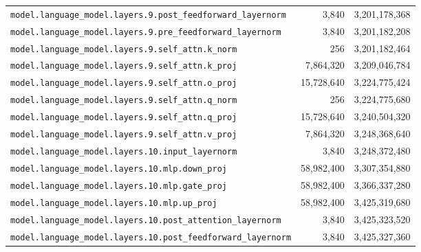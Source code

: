 \documentclass[10pt,a4paper]{article}
\theoremstyle{definition}
\begin{document}
\begin{appendices}
\begin{longtable}{p{9.5cm}rr}
\texttt{model.\allowbreak{}language\_model.\allowbreak{}layers.\allowbreak{}9.\allowbreak{}post\_feedforward\_layernorm} & 3,840 & 3,201,178,368 \\
\texttt{model.\allowbreak{}language\_model.\allowbreak{}layers.\allowbreak{}9.\allowbreak{}pre\_feedforward\_layernorm} & 3,840 & 3,201,182,208 \\
\texttt{model.\allowbreak{}language\_model.\allowbreak{}layers.\allowbreak{}9.\allowbreak{}self\_attn.\allowbreak{}k\_norm} & 256 & 3,201,182,464 \\
\texttt{model.\allowbreak{}language\_model.\allowbreak{}layers.\allowbreak{}9.\allowbreak{}self\_attn.\allowbreak{}k\_proj} & 7,864,320 & 3,209,046,784 \\
\texttt{model.\allowbreak{}language\_model.\allowbreak{}layers.\allowbreak{}9.\allowbreak{}self\_attn.\allowbreak{}o\_proj} & 15,728,640 & 3,224,775,424 \\
\texttt{model.\allowbreak{}language\_model.\allowbreak{}layers.\allowbreak{}9.\allowbreak{}self\_attn.\allowbreak{}q\_norm} & 256 & 3,224,775,680 \\
\texttt{model.\allowbreak{}language\_model.\allowbreak{}layers.\allowbreak{}9.\allowbreak{}self\_attn.\allowbreak{}q\_proj} & 15,728,640 & 3,240,504,320 \\
\texttt{model.\allowbreak{}language\_model.\allowbreak{}layers.\allowbreak{}9.\allowbreak{}self\_attn.\allowbreak{}v\_proj} & 7,864,320 & 3,248,368,640 \\
\texttt{model.\allowbreak{}language\_model.\allowbreak{}layers.\allowbreak{}10.\allowbreak{}input\_layernorm} & 3,840 & 3,248,372,480 \\
\texttt{model.\allowbreak{}language\_model.\allowbreak{}layers.\allowbreak{}10.\allowbreak{}mlp.\allowbreak{}down\_proj} & 58,982,400 & 3,307,354,880 \\
\texttt{model.\allowbreak{}language\_model.\allowbreak{}layers.\allowbreak{}10.\allowbreak{}mlp.\allowbreak{}gate\_proj} & 58,982,400 & 3,366,337,280 \\
\texttt{model.\allowbreak{}language\_model.\allowbreak{}layers.\allowbreak{}10.\allowbreak{}mlp.\allowbreak{}up\_proj} & 58,982,400 & 3,425,319,680 \\
\texttt{model.\allowbreak{}language\_model.\allowbreak{}layers.\allowbreak{}10.\allowbreak{}post\_attention\_layernorm} & 3,840 & 3,425,323,520 \\
\texttt{model.\allowbreak{}language\_model.\allowbreak{}layers.\allowbreak{}10.\allowbreak{}post\_feedforward\_layernorm} & 3,840 & 3,425,327,360 \\

\end{longtable}
\end{appendices}
\end{document}
